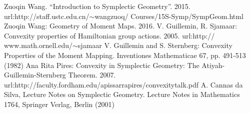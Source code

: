 \documentclass[11pt]{amsart}
\numberwithin{equation}{section}
\theoremstyle{plain}
\theoremstyle{plain}
\numberwithin{equation}{section}
\theoremstyle{remark}
\begin{document}




\begin{thebibliography}{99}


Zuoqin Wang. “Introduction to Symplectic Geometry”. 2015. url:http://staff.ustc.edu.cn/$\sim$wangzuoq/
Courses/15S-Symp/SympGeom.html
Zuoqin Wang: Geometry of Moment Maps. 2016.
V. Guillemin, R. Sjamaar: Convexity properties of Hamiltonian group actions. 2005.
url:http://
www.math.ornell.edu/$\sim$sjamaar
V. Guillemin and S. Sternberg: Convexity Properties of the Moment Mapping.
Inventiones Mathematicae 67, pp. 491-513 (1982)
Ana Rita Pires: Convexity in Symplectic Geometry: The
Atiyah-Guillemin-Sternberg Theorem. 2007.
url:http://faculty.fordham.edu/apissarrapires/convexitytalk.pdf
 A. Cannas da Silva, Lecture Notes on Symplectic Geometry. Lecture Notes
in Mathematics 1764, Springer Verlag, Berlin (2001)
\end{thebibliography}
\end{document}
